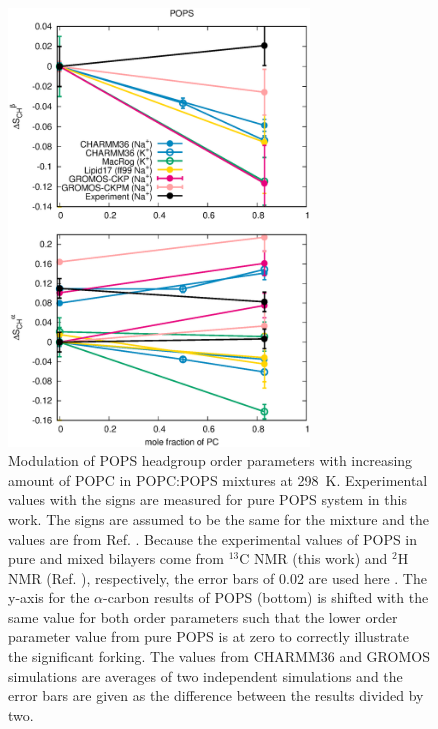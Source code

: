 \documentclass[aps,prl,superscriptaddress,twocolumn]{revtex4}
\begin{document}
\begin{figure}[!tb]
  \centering
  \includegraphics[width=8.0cm]{../Figs/HGorderparametersPSvsPC.eps}
  \caption{\label{HGorderparametersPSvsPC}
    Modulation of POPS headgroup order parameters with increasing amount of POPC in POPC:POPS mixtures at 298~K.
    Experimental values with the signs are measured for pure POPS system in this work.
    The signs are assumed to be the same for the mixture and the values are from Ref. .
    Because the experimental values of POPS in pure and mixed bilayers come from $^{13}$C NMR (this work) and $^2$H NMR (Ref. ), respectively,
    the error bars of 0.02 are used here \cite{botan15,ollila16}.
    The y-axis for the $\alpha$-carbon results of POPS (bottom) is shifted
    with the same value for both order parameters such that the lower order
    parameter value from pure POPS is at zero to correctly illustrate the significant forking.
    The values from CHARMM36 and GROMOS simulations are averages of two independent simulations and
    the error bars are given as the difference between the results divided by two.
  }
\end{figure}
\end{document}
